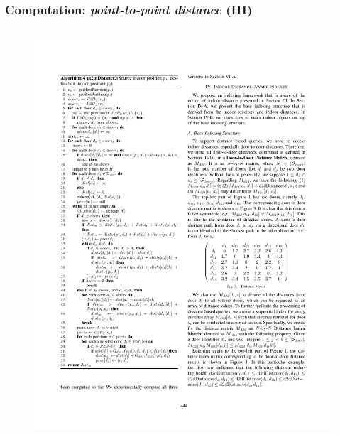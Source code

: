 
\begin{frame}
\frametitle{Computation: \emph{point-to-point distance} (III)}

\begin{columns}[c]

  \vspace{-25pt}
  \begin{figure}[tb]
    \includegraphics[width=\columnwidth]{figures/2-5/2-5-7.pdf}
  \end{figure}


\end{columns}
\end{frame}

